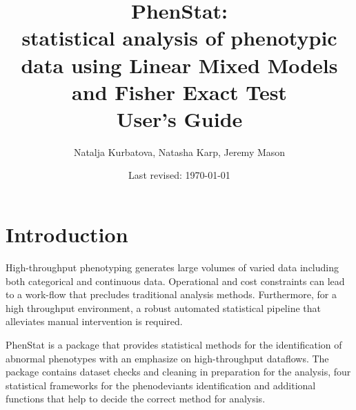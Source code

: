 \documentclass[12pt,a4paper]{article}
\title{\textbf{PhenStat}: \\ statistical analysis of phenotypic data using Linear Mixed Models and Fisher Exact Test\\ \textbf{User's Guide}}
\author{Natalja Kurbatova, Natasha Karp, Jeremy Mason}
\date{Last revised: \today}
\begin{document}
\maketitle
\newpage
\tableofcontents
\newpage
\section{Introduction}
High-throughput phenotyping generates large volumes of varied data including both categorical and continuous data. Operational and cost constraints can lead to a work-flow that precludes traditional analysis methods. Furthermore, for a high throughput environment, a robust automated statistical pipeline that alleviates manual intervention is required. 

PhenStat is a package that provides statistical methods for the identification of abnormal phenotypes with an emphasize on high-throughput dataflows. The package contains dataset checks and cleaning in preparation for the analysis, four statistical frameworks for the phenodeviants identification and additional functions that help to decide the correct method for analysis. 

\end{document}
